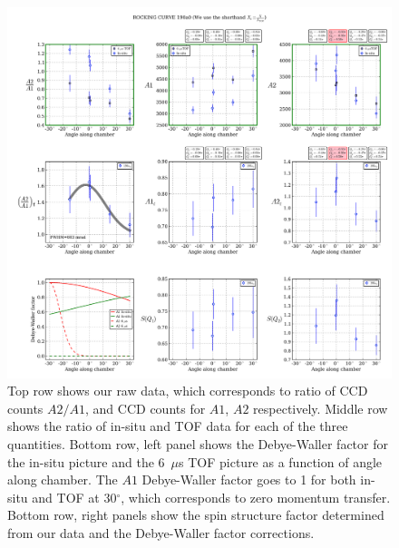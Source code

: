 \documentclass[11pt,letter]{article}
\begin{document}
\begin{figure}
\centering \includegraphics[width=\textwidth]{figures/rocking.png}
\caption[Rocking at 190$a_{0}$]{\small Top row shows our raw data, which corresponds to ratio of CCD counts $A2/A1$, and CCD counts for $A1$, $A2$ respectively.  Middle row shows the ratio of in-situ and TOF data for each of the three quantities.  Bottom row, left panel shows the Debye-Waller factor for the in-situ picture and the 6~$\mu$s TOF picture as a function of angle along chamber.  The $A1$ Debye-Waller factor goes to 1 for both in-situ and TOF at 30$^{\circ}$, which corresponds to zero momentum transfer.  Bottom row, right panels show the spin structure factor determined from our data and the Debye-Waller factor corrections. }
\label{fig:data}
\end{figure}
\end{document}
